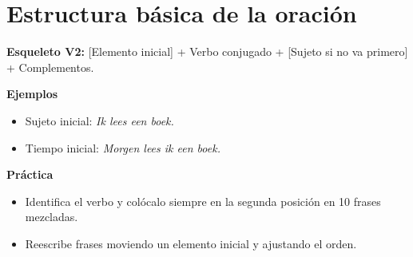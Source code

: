 \section{Estructura básica de la oración}
\textbf{Esqueleto V2:} [Elemento inicial] + Verbo conjugado + [Sujeto si no va primero] + Complementos.

\textbf{Ejemplos}
\begin{itemize}[leftmargin=*]
  \item Sujeto inicial: \textit{Ik lees een boek.}
  \item Tiempo inicial: \textit{Morgen lees ik een boek.}
\end{itemize}

\textbf{Práctica}
\begin{itemize}[leftmargin=*]
  \item Identifica el verbo y colócalo siempre en la segunda posición en 10 frases mezcladas.
  \item Reescribe frases moviendo un elemento inicial y ajustando el orden.
\end{itemize}
